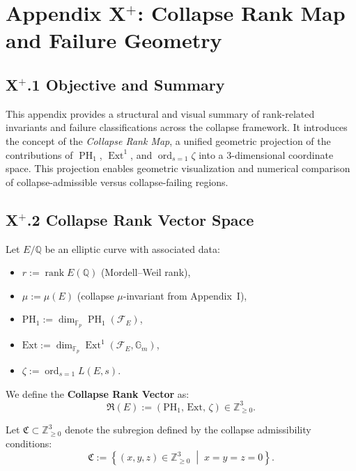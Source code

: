 \documentclass[11pt]{article}
\DeclareMathOperator{\Ext}{Ext}
\DeclareMathOperator{\PH}{PH}
\DeclareMathOperator{\rank}{rank}
\newcommand{\ord}{\operatorname{ord}}
\begin{document}
\appendix
\section*{Appendix X$^+$: Collapse Rank Map and Failure Geometry}

\subsection*{X$^+$.1 Objective and Summary}

This appendix provides a structural and visual summary of rank-related invariants and failure classifications across the collapse framework. It introduces the concept of the \emph{Collapse Rank Map}, a unified geometric projection of the contributions of $\PH_1$, $\Ext^1$, and $\ord_{s=1} \zeta$ into a 3-dimensional coordinate space. This projection enables geometric visualization and numerical comparison of collapse-admissible versus collapse-failing regions.

\subsection*{X$^+$.2 Collapse Rank Vector Space}

Let $E/\mathbb{Q}$ be an elliptic curve with associated data:

\begin{itemize}
  \item $r := \rank E(\mathbb{Q})$ (Mordell–Weil rank),
  \item $\mu := \mu(E)$ (collapse $\mu$-invariant from Appendix~I),
  \item $\mathrm{PH}_1 := \dim_{\mathbb{F}_p} \PH_1(\mathcal{F}_E)$,
  \item $\mathrm{Ext} := \dim_{\mathbb{F}_p} \Ext^1(\mathcal{F}_E, \mathbb{G}_m)$,
  \item $\zeta := \ord_{s=1} L(E, s)$.
\end{itemize}

We define the \textbf{Collapse Rank Vector} as:
\[
\mathfrak{R}(E) := \left( \mathrm{PH}_1,\, \mathrm{Ext},\, \zeta \right) \in \mathbb{Z}_{\geq 0}^3.
\]

Let $\mathfrak{C} \subset \mathbb{Z}_{\geq 0}^3$ denote the subregion defined by the collapse admissibility conditions:
\[
\mathfrak{C} := \left\{ (x, y, z) \in \mathbb{Z}_{\geq 0}^3 \;\middle|\; x = y = z = 0 \right\}.
\]
\end{document}
